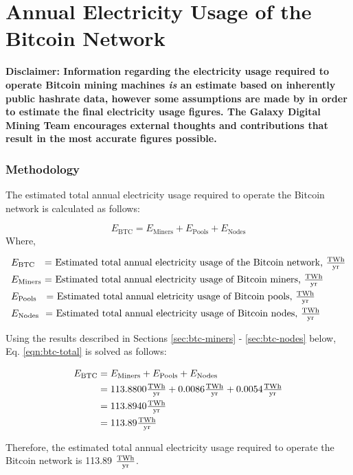 \section{Annual Electricity Usage of the Bitcoin Network}\label{section:btc}
\textbf{Disclaimer: Information regarding the electricity usage required to operate Bitcoin mining machines \textit{is} an estimate based on inherently public hashrate data, however some assumptions are made by in order to estimate the final electricity usage figures.
  The Galaxy Digital Mining Team encourages external thoughts and contributions that result in the most accurate figures possible.
}

\subsubsection{Methodology}
The estimated total annual electricity usage required to operate the Bitcoin network is calculated as follows:

\begin{equation}\label{eqn:btc-total}
  E_\textrm{BTC} = E_\textrm{Miners} + E_\textrm{Pools} + E_\textrm{Nodes}  
\end{equation}
\noindent
Where,

\begin{align*}
&E_\textrm{BTC}     \textrm{ \ \  = Estimated total annual electricity usage of the Bitcoin network, $\tfrac{ \textrm{{T}Wh} } { \textrm{yr} }$} \\
&E_\textrm{Miners}  \textrm{      = Estimated total annual electricity usage of Bitcoin miners, $\tfrac{ \textrm{{T}Wh} } { \textrm{yr} }$} \\
&E_\textrm{Pools}   \textrm{ \ \  = Estimated total annual eletricity usage of Bitcoin pools, $\tfrac{ \textrm{{T}Wh} } { \textrm{yr} }$} \\
&E_\textrm{Nodes}   \textrm{ \    = Estimated total annual electricity usage of Bitcoin nodes, $\tfrac{ \textrm{{T}Wh} } { \textrm{yr} }$}
\end{align*}

Using the results described in Sections \ref{sec:btc-miners} - \ref{sec:btc-nodes} below, Eq. \eqref{eqn:btc-total} is solved as follows:

\begin{align}\label{eqn:btc-total-res}
  E_\textrm{BTC} &= E_\textrm{Miners} + E_\textrm{Pools} + E_\textrm{Nodes} \nonumber \\
                 &= 113.8800 \tfrac{ \textrm{{T}Wh} } { \textrm{yr} } + 0.0086 \tfrac{ \textrm{{T}Wh} } { \textrm{yr} } + 0.0054 \tfrac{ \textrm{{T}Wh} } { \textrm{yr} } \nonumber \\
                 &= 113.8940 \tfrac{ \textrm{{T}Wh} } { \textrm{yr} } \nonumber \\
                 &= 113.89 \tfrac{ \textrm{{T}Wh} } { \textrm{yr} }
\end{align}

Therefore, the estimated total annual electricity usage required to operate the Bitcoin network is 113.89 $\tfrac{ \textrm{{T}Wh} } { \textrm{yr} }$.
